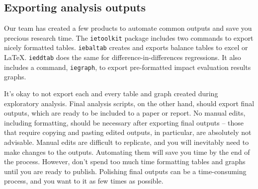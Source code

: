 \subsection{Exporting analysis outputs}

Our team has created a few products to automate common outputs and save you
precious research time.
The \texttt{ietoolkit} package includes two commands to export nicely formatted tables.
\texttt{iebaltab}
creates and exports balance tables to excel or {\LaTeX}.
\texttt{ieddtab}
does the same for difference-in-differences regressions.
It also includes a command, \texttt{iegraph},
to export pre-formatted impact evaluation results graphs.

It's okay to not export each and every table and graph created during exploratory analysis.
Final analysis scripts, on the other hand, should export final outputs,
which are ready to be included to a paper or report.
No manual edits, including formatting, should be necessary after exporting final outputs --
those that require copying and pasting edited outputs,
in particular, are absolutely not advisable.
Manual edits are difficult to replicate,
and you will inevitably need to make changes to the outputs.
Automating them will save you time by the end of the process.
However, don't spend too much time formatting tables and graphs until you are ready to publish.
Polishing final outputs can be a time-consuming process,
and you want to it as few times as possible.

